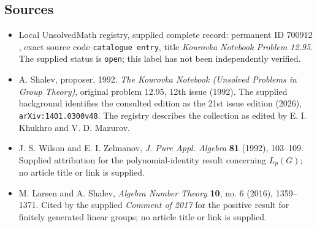 \documentclass[11pt]{article}
\begin{document}
\subsection{Sources}
\begin{itemize}
\item Local UnsolvedMath registry, supplied complete record: permanent ID \(700912\), exact source code \texttt{catalogue entry}, title \emph{Kourovka Notebook Problem 12.95}. The supplied status is \texttt{open}; this label has not been independently verified.
\item A. Shalev, proposer, 1992. \emph{The Kourovka Notebook (Unsolved Problems in Group Theory)}, original problem 12.95, 12th issue (1992). The supplied background identifies the consulted edition as the 21st issue edition (2026), \texttt{arXiv:1401.0300v48}. The registry describes the collection as edited by E. I. Khukhro and V. D. Mazurov.
\item J. S. Wilson and E. I. Zelmanov, \emph{J. Pure Appl. Algebra} \textbf{81} (1992), 103--109. Supplied attribution for the polynomial-identity result concerning \(L_p(G)\); no article title or link is supplied.
\item M. Larsen and A. Shalev, \emph{Algebra Number Theory} \textbf{10}, no. 6 (2016), 1359--1371. Cited by the supplied \emph{Comment of 2017} for the positive result for finitely generated linear groups; no article title or link is supplied.
\end{itemize}
\end{document}
